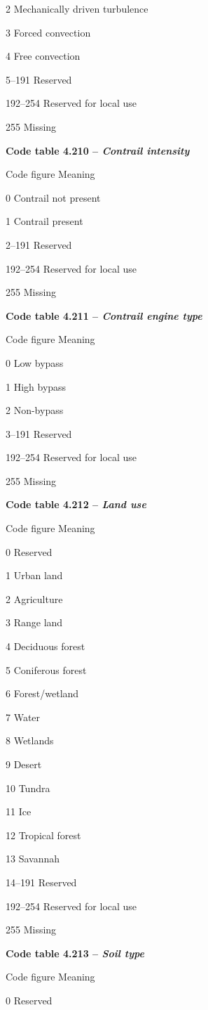 2 Mechanically driven turbulence

3 Forced convection

4 Free convection

5--191 Reserved

192--254 Reserved for local use

255 Missing

\textbf{Code table 4.210 -- \emph{Contrail intensity}}

Code figure Meaning

0 Contrail not present

1 Contrail present

2--191 Reserved

192--254 Reserved for local use

255 Missing

\textbf{Code table 4.211 -- \emph{Contrail engine type}}

Code figure Meaning

0 Low bypass

1 High bypass

2 Non-bypass

3--191 Reserved

192--254 Reserved for local use

255 Missing

\textbf{Code table 4.212 -- \emph{Land use}}

Code figure Meaning

0 Reserved

1 Urban land

2 Agriculture

3 Range land

4 Deciduous forest

5 Coniferous forest

6 Forest/wetland

7 Water

8 Wetlands

9 Desert

10 Tundra

11 Ice

12 Tropical forest

13 Savannah

14--191 Reserved

192--254 Reserved for local use

255 Missing

\textbf{Code table 4.213 -- \emph{Soil type}}

Code figure Meaning

0 Reserved

